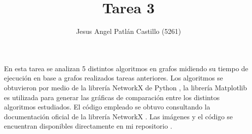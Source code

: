 \documentclass{article}
\title{Tarea 3}
\author{Jesus Angel Patlán Castillo (5261)}
\date{\displaydate{date}}
\begin{document}
 
 
\lstset{style=mystyle}


\maketitle

En esta tarea se analizan 5 distintos algoritmos en grafos midiendo su tiempo de ejecución en base a grafos realizados tareas anteriores. Los algoritmos se obtuvieron por medio de la librería NetworkX \cite{NetworkX} de Python \cite{Python}, la librería Matplotlib \cite{Matplotlib} es utilizada para generar las gráficas de comparación entre los distintos algoritmos estudiados. El código empleado se obtuvo consultando la documentación oficial de la librería NetworkX \cite{NetworkXD}. Las imágenes y el código se encuentran disponibles directamente en mi repositorio \cite{JAPC}.
\end{document}
